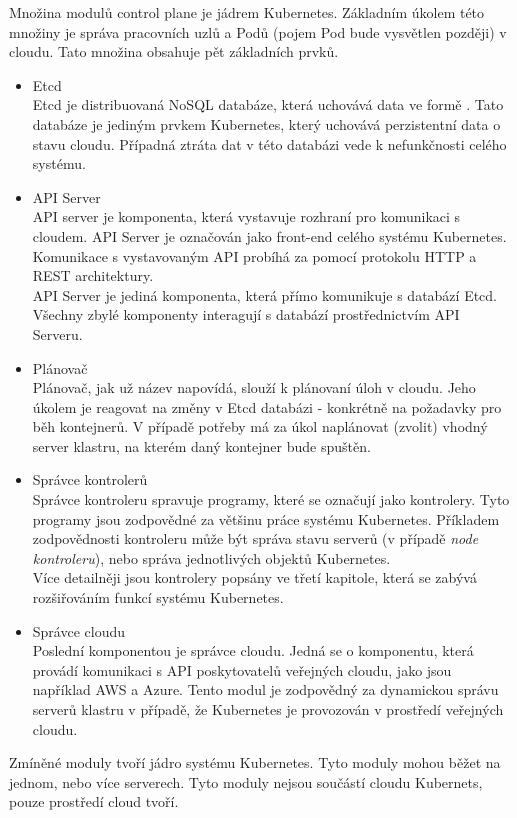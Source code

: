 Množina modulů control plane je jádrem Kubernetes. Základním úkolem této množiny je správa pracovních uzlů a Podů (pojem Pod bude vysvětlen později) v cloudu. \cite{thekubernetesauthors_2022_kubernetes} Tato množina obsahuje pět základních prvků.
\begin{itemize}
    \item Etcd\\
    Etcd je distribuovaná NoSQL databáze, která uchovává data  ve formě . Tato databáze je jediným prvkem Kubernetes, který uchovává perzistentní data o stavu cloudu. Případná ztráta dat v této databázi vede k nefunkčnosti celého systému.
    \item API Server\\
    API server je komponenta, která vystavuje rozhraní pro komunikaci s cloudem. API Server je označován jako front-end celého systému Kubernetes. Komunikace s vystavovaným API probíhá za pomocí protokolu HTTP a REST architektury.\\
    API Server je jediná komponenta, která přímo komunikuje s databází Etcd. Všechny zbylé komponenty interagují s databází prostřednictvím API Serveru.
    \item Plánovač\\
    Plánovač, jak už název napovídá, slouží k plánovaní úloh v cloudu. Jeho úkolem je reagovat na změny v Etcd databázi - konkrétně na požadavky pro běh kontejnerů. V případě potřeby má za úkol naplánovat (zvolit) vhodný server klastru, na kterém daný kontejner bude spuštěn.  
    \item Správce kontrolerů\\
    Správce kontroleru spravuje programy, které se označují jako kontrolery. Tyto programy jsou zodpovědné za většinu práce systému Kubernetes. Příkladem zodpovědnosti kontroleru může být správa stavu serverů (v případě \textit{node kontroleru}), nebo správa jednotlivých objektů Kubernetes.\\
    Více detailněji jsou kontrolery popsány ve třetí kapitole, která se zabývá rozšiřováním funkcí systému Kubernetes. 
    \item Správce cloudu\\
    Poslední komponentou je správce cloudu. Jedná se o komponentu, která provádí komunikaci s API poskytovatelů veřejných cloudu, jako jsou například AWS a Azure. Tento modul je zodpovědný za dynamickou správu serverů klastru v případě, že Kubernetes je provozován v prostředí veřejných cloudu.  
\end{itemize}
Zmíněné moduly tvoří jádro systému Kubernetes. Tyto moduly mohou běžet na jednom, nebo více serverech. Tyto moduly nejsou součástí cloudu Kubernets, pouze prostředí cloud tvoří. 


